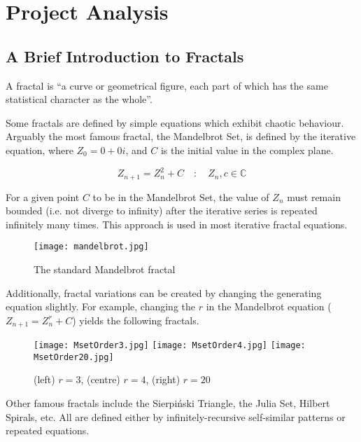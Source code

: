 \section{Project Analysis} \label{analysis}

\subsection{A Brief Introduction to Fractals}

A fractal is ``a curve or geometrical figure, each part of which has the same statistical character as the whole''\cite{soanes_hawker_2013}.

Some fractals are defined by simple equations which exhibit chaotic behaviour. Arguably the most famous fractal, the Mandelbrot Set, is defined by the iterative equation, where \(Z_0=0+0i\), and \(C\) is the initial value in the complex plane.

\begin{equation*}
	Z_{n+1} = Z_n^2 + C \quad:\quad Z_n, c \in \mathbb{C}		
\end{equation*}

For a given point \(C\) to be in the Mandelbrot Set, the value of \(Z_n\) must remain bounded (i.e. not diverge to infinity) after the iterative series is repeated infinitely many times. This approach is used in most iterative fractal equations.

\vspace{0.5cm}

\begin{figure}[h]
	\texttt{[image: mandelbrot.jpg]}
	\caption{The standard Mandelbrot fractal\cite{bourke_2002}}
\end{figure}

Additionally, fractal variations can be created by changing the generating equation slightly. For example, changing the \(r\) in the Mandelbrot equation (\(Z_{n+1}=Z_n^r+C\)) yields the following fractals.

\begin{figure} [htp]
	\centering
	\texttt{[image: MsetOrder3.jpg]}\hfill
	\texttt{[image: MsetOrder4.jpg]}\hfill
	\texttt{[image: MsetOrder20.jpg]}
	
	\caption{(left) \(r=3\), (centre) \(r=4\), (right) \(r=20\)}
\end{figure}

Other famous fractals include the Sierpiński Triangle, the Julia Set, Hilbert Spirals, etc. All are defined either by infinitely-recursive self-similar patterns or repeated equations.

